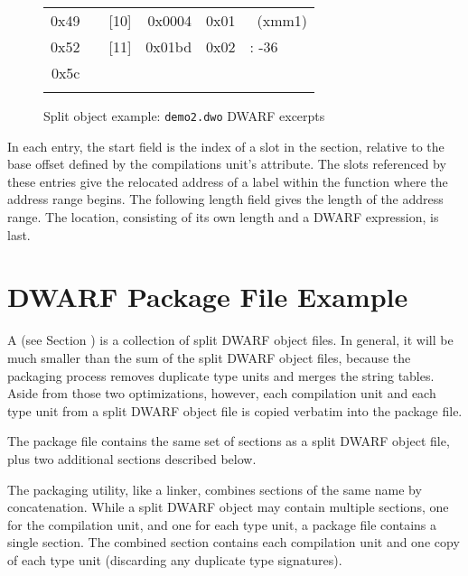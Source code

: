 \begin{figure}[ht]
\begin{dwflisting}
\begin{center}
\begin{tabular}{rl|rr|rl}
0x49 & \XXLLEsl & [10] & 0x0004 & \bb 0x01 \eb& \DWOPregeighteen~(xmm1) \\
0x52 & \XXLLEsl & [11] & 0x01bd & \bb 0x02 \eb& \DWOPfbreg: -36 \\
0x5c & \XXLLEeol &&&& \\
&&&& \\
\end{tabular}
\end{center}
\end{dwflisting}
\caption{Split object example: \texttt{demo2.dwo} DWARF \dotdebugloclistsdwo{} excerpts}
\label{fig:splitobjectexampledemotwodwodwarfdebuglocdwoexcerpts}
\end{figure}

In each \DWLLEstartlength{} entry, 
the start field is the index
of a slot in the \dotdebugaddr{} section, relative to the base
offset defined by the compilations unit's \DWATaddrbase{}
attribute. The \dotdebugaddr{} slots referenced by these entries give
the relocated address of a label within the function where the
address range begins. 
The following length field gives the length of the
address range. The location, consisting of its own length and
a DWARF expression, is last.

\clearpage
\section{DWARF Package File Example}
\label{app:dwarfpackagefileexample}

A  
(see Section ) 
is a collection of split DWARF object files.
In general, it will be much smaller than the sum of the split
DWARF object files, because the packaging process removes duplicate
type units and merges the string tables. Aside from those two
optimizations, however, each compilation unit and each type unit
from a split DWARF object file is copied verbatim into the package
file.

The package file contains the same set of sections as a split
DWARF object file, plus two additional sections described below.

The packaging utility, like a linker, combines sections of the
same name by concatenation. While a split DWARF object may
contain multiple \dotdebuginfodwo{} sections, one for the
compilation unit, and one for each type unit, a package file
contains a single \dotdebuginfodwo{} section. The combined
\dotdebuginfodwo{} section contains each compilation unit and one
copy of each type unit (discarding any duplicate type
signatures).

